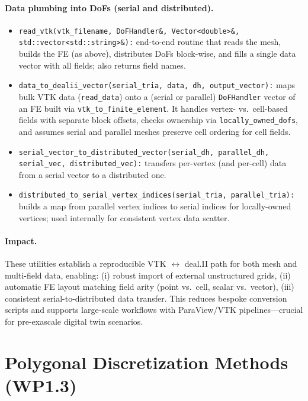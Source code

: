 \documentclass[a4paper,12pt]{article}
\begin{document}
\paragraph{Data plumbing into DoFs (serial and distributed).}
\begin{itemize}
  \item \texttt{read\_vtk(vtk\_filename, DoFHandler\&, Vector<double>\&, std::vector<std::string>\&):}
        end-to-end routine that reads the mesh, builds the FE (as above),
        distributes DoFs block-wise, and fills a single data vector with all
        fields; also returns field names.
  \item \texttt{data\_to\_dealii\_vector(serial\_tria, data, dh, output\_vector):}
        maps bulk VTK data (\texttt{read\_data}) onto a (serial or parallel)
        \texttt{DoFHandler} vector of an FE built via \texttt{vtk\_to\_finite\_element}.
        It handles vertex- vs.\ cell-based fields with separate block offsets,
        checks ownership via \texttt{locally\_owned\_dofs}, and assumes serial
        and parallel meshes preserve cell ordering for cell fields.
  \item \texttt{serial\_vector\_to\_distributed\_vector(serial\_dh, parallel\_dh, serial\_vec, distributed\_vec):}
        transfers per-vertex (and per-cell) data from a serial vector to a
        distributed one.
  \item \texttt{distributed\_to\_serial\_vertex\_indices(serial\_tria, parallel\_tria):}
        builds a map from parallel vertex indices to serial indices for
        locally-owned vertices; used internally for consistent vertex data scatter.
\end{itemize}

\paragraph{Impact.} These utilities establish a reproducible VTK $\leftrightarrow$
deal.II path for both mesh and multi-field data, enabling:
(i) robust import of external unstructured grids,
(ii) automatic FE layout matching field arity (point vs.\ cell, scalar vs.\ vector),
(iii) consistent serial-to-distributed data transfer.
This reduces bespoke conversion scripts and supports large-scale workflows with
ParaView/VTK pipelines—crucial for pre-exascale digital twin scenarios.


\section{Polygonal Discretization Methods (WP1.3)}
\end{document}
